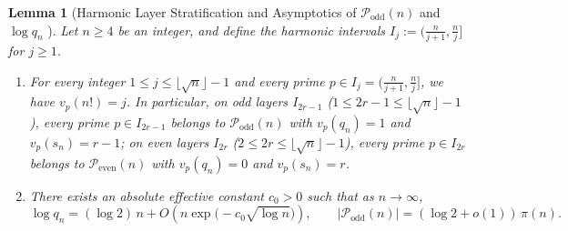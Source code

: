 \documentclass[11pt,reqno]{amsart}
\newtheorem{lemma}[theorem]{Lemma}
\theoremstyle{remark}
\numberwithin{equation}{section}
\newcommand{\Podd}{\mathcal{P}_{\mathrm{odd}}}
\newcommand{\Peven}{\mathcal{P}_{\mathrm{even}}}
\begin{document}
\begin{lemma}[{Harmonic Layer Stratification and Asymptotics of $\Podd(n)$ and $\log q_n$ \cite{Berend1997,Sander2001,Broughan2002}}]\label{lem:2.1}
Let $n \ge 4$ be an integer, and define the harmonic intervals $I_j := \bigl(\frac{n}{j+1}, \frac{n}{j}\bigr]$ for $j \ge 1$.
\begin{enumerate}
\item[(i)] For every integer $1 \le j \le \lfloor \sqrt{n} \rfloor - 1$ and every prime $p \in I_j = \bigl(\frac{n}{j+1}, \frac{n}{j}\bigr]$, we have $v_p(n!) = j$. In particular, on odd layers $I_{2r-1}$ ($1 \le 2r - 1 \le \lfloor \sqrt{n} \rfloor - 1$), every prime $p \in I_{2r-1}$ belongs to $\Podd(n)$ with $v_p(q_n) = 1$ and $v_p(s_n) = r - 1$; on even layers $I_{2r}$ ($2 \le 2r \le \lfloor \sqrt{n} \rfloor - 1$), every prime $p \in I_{2r}$ belongs to $\Peven(n)$ with $v_p(q_n) = 0$ and $v_p(s_n) = r$.
\item[(ii)] There exists an absolute effective constant $c_0 > 0$ such that as $n \to \infty$,
\begin{equation}\label{eq:2.4}
\log q_n = (\log 2)\,n + O\!\left(n\exp\bigl(-c_0\sqrt{\log n}\bigr)\right), \qquad |\Podd(n)| = (\log 2 + o(1))\,\pi(n).
\end{equation}
\end{enumerate}
\end{lemma}
\end{document}
